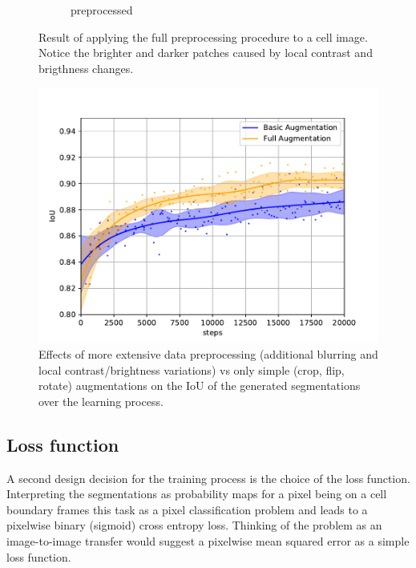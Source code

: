\documentclass[aps,prl,twocolumn,groupedaddress,amsmath,amssymb]{revtex4-1}
\begin{document}
\begin{figure}[tbp]
\begin{subfigure}[c]{0.45\linewidth}
            \caption{preprocessed}
        \end{subfigure}
        \caption{Result of applying the full preprocessing procedure to a cell image. 
        Notice the brighter and darker patches caused by local contrast and brigthness changes.}
        \label{fig:augmentimage}
    \end{figure}

    \begin{figure}[tbp]
        \begin{center}
        \includegraphics[width=\linewidth]{figures/augment.pdf}
        \end{center}
        \caption{Effects of more extensive data preprocessing (additional blurring and local 
        contrast/brightness variations) vs only simple (crop, flip, rotate) augmentations on the 
        IoU of the generated segmentations over the learning process.}
        \label{fig:augment}
    \end{figure}

    \subsection{Loss function}
    A second design decision for the training process is the choice of the loss function. 
    Interpreting the segmentations as probability maps for a pixel being on a cell boundary frames
    this task as a pixel classification problem and leads to a pixelwise binary (sigmoid) cross 
    entropy loss. Thinking of the problem as an image-to-image transfer would suggest a pixelwise
    mean squared error as a simple loss function. 
\end{document}

